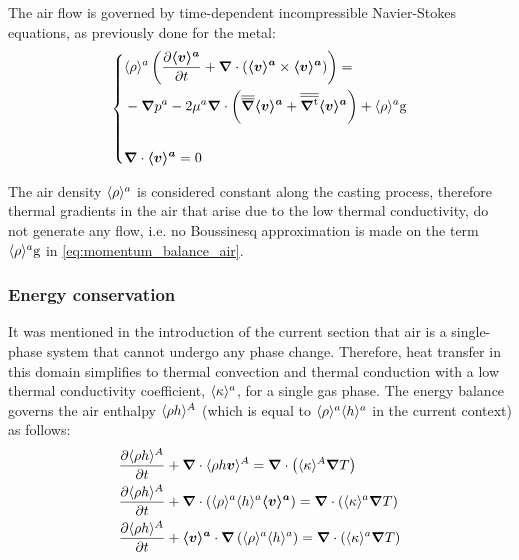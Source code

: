 The air flow is governed by time-dependent incompressible Navier-Stokes equations, as previously done for the metal:
\begin{equation}
\label{eq:momentum_balance_air}
   \left\{
   \begin{aligned}
      & \rhoa \brac{\tempup{ \va } + \nabvec \cdot \brac{\va \times \va}} = \\
	  &- \nabvec \pa - 2 \mua \nabvec \cdot \brac{\nabmat \va + \nabmattransp \va}
	   + \rhoa \gravity\\ \\
      & \nabvec \cdot \va = 0
    \end{aligned}
    \right.
\end{equation}

The air density $\langle \rho \rangle^a$ is considered constant along the casting process, 
therefore thermal gradients in the air that arise due to the low
thermal conductivity, do not generate any flow, i.e. no Boussinesq approximation 
is made on the term $\langle \rho \rangle^a \boldsymbol{\text{g}}$ in \cref{eq:momentum_balance_air}.


\subsubsection{Energy conservation}

It was mentioned in the introduction of the current section that air is a single-phase system
that cannot undergo any phase change. Therefore, heat transfer in this domain simplifies to thermal convection
and thermal conduction with a low thermal conductivity coefficient, $\langle \kappa \rangle^a$, for a single gas phase.
The energy balance governs the air enthalpy $\langle \rho h \rangle^A$ (which is equal to $\langle \rho \rangle^a \langle h \rangle^a$ 
in the current context) as follows:
\begin{subequations}
\begin{align}
	& \tempup{\avg{\rho h}^A} + \nabvec \cdot \avg{\rho h \vec{v}}^A 
	= \nabvec  \cdot \brac{\avg{\kappa}^A \nabvec T } \\
	& \tempup{\avg{\rho h}^A} + \nabvec \cdot \brac{ \rhoa \ha \va} 
	= \nabvec  \cdot \brac{\ka\nabvec T } \\
	\label{eq:energy_balance_air}
	& \tempup{\avg{\rho h}^A}
		+ \va \cdot \nabvec \brac{\rhoa \ha}
		= \nabvec  \cdot \brac{\ka\nabvec T }
\end{align}
\end{subequations}


